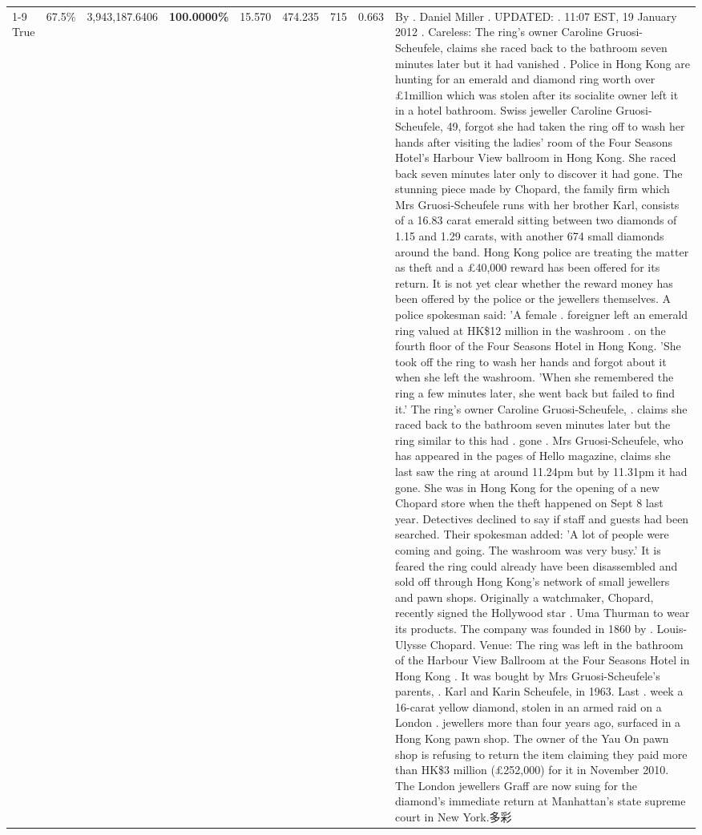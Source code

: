 \begin{table}[H]
\begin{tabular}{lllrlllll}
\cline{1-9}
True & 67.5\% & 3,943,187.6406 & \bfseries \color{red} 100.0000\% & 15.570 & 474.235 & 715 & 0.663 & By . Daniel Miller . UPDATED: . 11:07 EST, 19 January 2012 . Careless: The ring's owner Caroline Gruosi-Scheufele, claims she raced back to the bathroom seven minutes later but it had vanished . Police in Hong Kong are hunting for an emerald and diamond ring worth over £1million which was stolen after its socialite owner left it in a hotel bathroom. Swiss jeweller Caroline Gruosi-Scheufele, 49, forgot she had taken the ring off to wash her hands after visiting the ladies' room of the Four Seasons Hotel's Harbour View ballroom in Hong Kong. She raced back seven minutes later only to discover it had gone. The stunning piece made by Chopard, the family firm which Mrs Gruosi-Scheufele runs with her brother Karl, consists of a 16.83 carat emerald sitting between two diamonds of 1.15 and 1.29 carats, with another 674 small diamonds around the band. Hong Kong police are treating the matter as theft and a £40,000 reward has been offered for its return. It is not yet clear whether the reward money has been offered by the police or the jewellers themselves. A police spokesman said: 'A female . foreigner left an emerald ring valued at HK\$12 million in the washroom . on the fourth floor of the Four Seasons Hotel in Hong Kong. 'She took off the ring to wash her hands and forgot about it when she left the washroom. 'When she remembered the ring a few minutes later, she went back but failed to find it.' The ring's owner Caroline Gruosi-Scheufele, . claims she raced back to the bathroom seven minutes later but the ring similar to this had . gone . Mrs Gruosi-Scheufele, who has appeared in the pages of Hello magazine, claims she last saw the ring at around 11.24pm but by 11.31pm it had gone. She was in Hong Kong for the opening of a new Chopard store when the theft happened on Sept 8 last year. Detectives declined to say if staff and guests had been searched. Their spokesman added: 'A lot of people were coming and going. The washroom was very busy.' It is feared the ring could already have been disassembled and sold off through Hong Kong's network of small jewellers and pawn shops. Originally a watchmaker, Chopard, recently signed the Hollywood star . Uma Thurman to wear its products. The company was founded in 1860 by . Louis-Ulysse Chopard. Venue: The ring was left in the bathroom of the Harbour View Ballroom at the Four Seasons Hotel in Hong Kong . It was bought by Mrs Gruosi-Scheufele's  parents, . Karl and Karin Scheufele, in 1963. Last . week a 16-carat yellow diamond, stolen in an armed raid on a London . jewellers more than four years ago, surfaced in a Hong Kong pawn shop. The owner of the Yau On pawn shop is refusing to return the item claiming they paid more than HK\$3 million (£252,000) for it in November 2010. The London jewellers Graff are now suing for the diamond’s immediate return at Manhattan’s state supreme court in New York.多彩 \\

\end{tabular}
\end{table}
